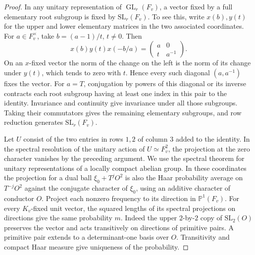 \documentclass[a4paper,11pt]{article}
\theoremstyle{definition}
\theoremstyle{remark}
\numberwithin{equation}{section}
\newcommand{\GL}{\operatorname{GL}}
\begin{document}
\begin{proof}
In any unitary representation of \(\GL_r(F_v)\), a vector
fixed by a full elementary root subgroup is fixed by
\(\mathrm{SL}_r(F_v)\). To see this, write \(x(b),y(t)\)
for the upper and lower elementary matrices in the two
associated coordinates. For \(a\in F_v^\times\), take
\(b=(a-1)/t\), \(t\ne0\). Then
\[
           x(b)y(t)x(-b/a)=
                    \begin{pmatrix}a&0\\t&a^{-1}\end{pmatrix}.
\]
On an \(x\)-fixed vector the norm of the change on the left is
the norm of its change under \(y(t)\), which tends to zero
with \(t\). Hence every such diagonal \((a,a^{-1})\) fixes
the vector. For \(a=T\), conjugation by powers of this diagonal
or its inverse contracts each root subgroup having at least one
index in this pair to the identity. Invariance and continuity give
invariance under all those subgroups. Taking their commutators
gives the remaining elementary subgroups, and row reduction
generates \(\mathrm{SL}_r(F_v)\).

Let \(U\) consist of the two entries in rows \(1,2\) of column
\(3\) added to the identity. In the spectral resolution of the
unitary action of \(U\simeq F_v^2\), the projection at the zero
character vanishes by the preceding argument. We use the spectral
theorem for unitary representations of a locally compact abelian
group. In these coordinates the projection for a dual ball
\(\xi_0+T^jO^2\) is also the Haar probability average on
\(T^{-j}O^2\) against the conjugate character of \(\xi_0\),
using an additive character of conductor \(O\).
Project each nonzero frequency to its direction in
\(\mathbb P^1(F_v)\). For every \(K_v\)-fixed unit vector, the
squared lengths of its spectral projections on directions give
the same probability \(m\). Indeed the upper \(2\)-by-\(2\)
copy of \(\mathrm{SL}_2(O)\) preserves the vector and acts
transitively on directions of primitive pairs. A primitive pair
extends to a determinant-one basis over \(O\). Transitivity
and compact Haar measure give uniqueness of the probability.


\end{proof}
\end{document}
